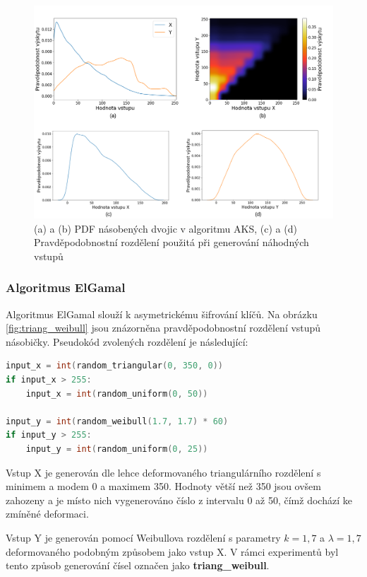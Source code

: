 \begin{figure}[H]
    \centering
    \includegraphics[width=\textwidth]{obrazky-figures/triang_beta_all.png}
    \caption{(a) a (b) PDF násobených dvojic v algoritmu AKS, (c) a (d) Pravděpodobnostní rozdělení použitá při generování náhodných vstupů}
    \label{fig:triang_beta}
\end{figure}

\pagebreak

\subsubsection{Algoritmus ElGamal}
Algoritmus ElGamal slouží k asymetrickému šifrování klíčů. Na obrázku \ref{fig:triang_weibull} jsou znázorněna pravděpodobnostní rozdělení vstupů násobičky. Pseudokód zvolených rozdělení je následující:

\begin{lstlisting}[language={C}, label={lst:elgamal}]
input_x = int(random_triangular(0, 350, 0))
if input_x > 255:
    input_x = int(random_uniform(0, 50))

input_y = int(random_weibull(1.7, 1.7) * 60)
if input_y > 255:
    input_y = int(random_uniform(0, 25))
\end{lstlisting}

Vstup X je generován dle lehce deformovaného triangulárního rozdělení s minimem a modem 0 a maximem 350. Hodnoty větší než 350 jsou ovšem zahozeny a je místo nich vygenerováno číslo z intervalu 0 až 50, čímž dochází ke zmíněné deformaci.

Vstup Y je generován pomocí Weibullova rozdělení s parametry $k = 1,7$ a $\lambda = 1,7$ deformovaného podobným způsobem jako vstup X. V rámci experimentů byl tento způsob generování čísel označen jako \textbf{triang\_weibull}.

